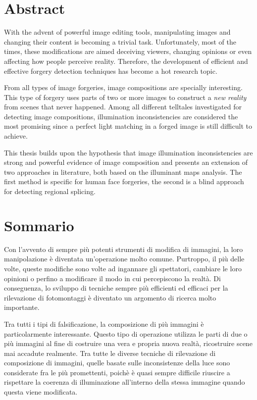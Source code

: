 \chapter*{Abstract}

With the advent of powerful image editing tools, manipulating images and changing their content is becoming a trivial task. Unfortunately, most of the times, these modifications are aimed deceiving viewers, changing opinions or even affecting how people perceive reality. Therefore, the development of efficient and effective forgery detection techniques has become a hot research topic. 

From all types of image forgeries, image compositions are specially interesting. This type of forgery uses parts of two or more images to construct a \emph{new reality} from scenes that never happened. Among all different telltales investigated for detecting image compositions, illumination inconsistencies are considered the most promising since a perfect light matching in a forged image is still difficult to achieve. 

This thesis builds upon the hypothesis that image illumination inconsistencies are strong and powerful evidence of image composition and presents an extension of two approaches in literature, both based on the illuminant maps analysis. The first method is specific for human face forgeries, the second is a blind approach for detecting regional splicing.


\chapter*{Sommario}

Con l'avvento di sempre più potenti strumenti di modifica di immagini, la loro manipolazione è diventata un'operazione molto comune. Purtroppo, il più delle volte, queste modifiche sono volte ad ingannare gli spettatori, cambiare le loro opinioni o perfino a modificare il modo in cui percepiscono la realtà. Di conseguenza, lo sviluppo di tecniche sempre più efficienti ed efficaci per la rilevazione di fotomontaggi  è diventato un argomento di ricerca molto importante. 


Tra tutti i tipi di falsificazione, la composizione di più immagini è particolarmente interessante. Questo tipo di operazione utilizza le parti di due o più immagini al fine di costruire una vera e propria nuova realtà, ricostruire scene mai accadute realmente. Tra tutte le diverse tecniche di rilevazione di composizione di immagini, quelle basate sulle inconsistenze della luce sono considerate fra le più promettenti, poichè è quasi sempre difficile riuscire a rispettare la coerenza di illuminazione all'interno della stessa immagine quando questa viene modificata.

